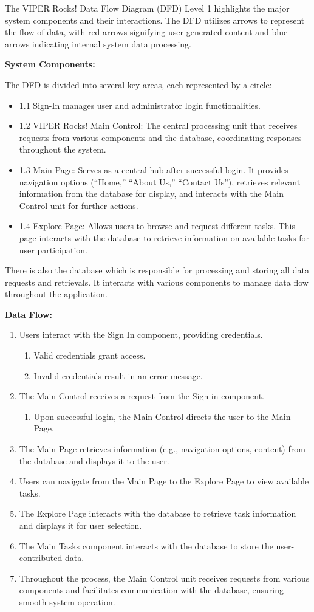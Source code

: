 \documentclass{article}
\begin{document}
The VIPER Rocks! Data Flow Diagram (DFD) Level 1 highlights the major system components and their interactions. The DFD utilizes arrows to represent the flow of data, with red arrows signifying user-generated content and blue arrows indicating internal system data processing.

\textbf{System Components:}

The DFD is divided into several key areas, each represented by a circle:
\begin{itemize}
	\item 1.1 Sign-In manages user and administrator login functionalities.
	\item 1.2 VIPER Rocks! Main Control: The central processing unit that receives requests from various components and the database, coordinating responses throughout the system. 
	\item 1.3 Main Page: Serves as a central hub after successful login. It provides navigation options (“Home,” “About Us,” “Contact Us”), retrieves relevant information from the database for display, and interacts with the Main Control unit for further actions.
	\item 1.4 Explore Page: Allows users to browse and request different tasks. This page interacts with the database to retrieve information on available tasks for user participation.
\end{itemize}
There is also the database which is responsible for processing and storing all data requests and retrievals. It interacts with various components to manage data flow throughout the application.

\textbf{Data Flow:}
\begin{enumerate}
\item Users interact with the Sign In component, providing credentials.
	\begin{enumerate}[label=(\alph*)]
		\item Valid credentials grant access.
		\item Invalid credentials result in an error message.
	\end{enumerate}
\item The Main Control receives a request from the Sign-in component.
	\begin{enumerate}[label=(\alph*)]
		\item Upon successful login, the Main Control directs the user to the Main Page.
	\end{enumerate}
\item The Main Page retrieves information (e.g., navigation options, content) from the
database and displays it to the user.
\item Users can navigate from the Main Page to the Explore Page to view available tasks.
\item The Explore Page interacts with the database to retrieve task information and displays it
for user selection.
\item The Main Tasks component interacts with the database to store the user-contributed data.
\item Throughout the process, the Main Control unit receives requests from various components and facilitates communication with the database, ensuring smooth system operation.
\end{enumerate}
\end{document}
